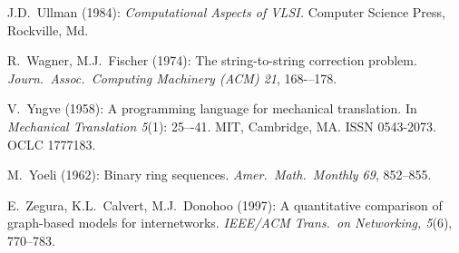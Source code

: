 \begin{thebibliography}{999}

J.D.~Ullman (1984):
{\it Computational Aspects of VLSI.}
Computer Science Press, Rockville, Md.



R.~Wagner, M.J.~Fischer (1974):
The string-to-string correction problem.
{\it Journ.~Assoc.~Computing Machinery (ACM) 21}, 168-–178.


V.~Yngve (1958): 
A programming language for mechanical translation.
In {\it Mechanical Translation 5}(1): 25–-41.  MIT, Cambridge, MA.
ISSN 0543-2073. OCLC 1777183.

M.~Yoeli (1962): Binary ring sequences.  {\it Amer.~Math.~Monthly 69},
852--855.


E.~Zegura, K.L.~Calvert, M.J.~Donohoo (1997):
A quantitative comparison of graph-based models for internetworks.
{\it IEEE/ACM Trans.~on Networking, 5}(6), 770--783.
\end{thebibliography}

